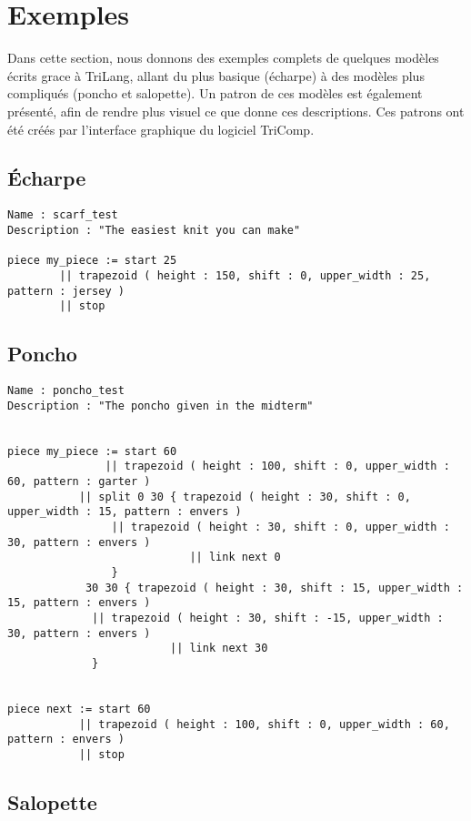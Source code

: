 \documentclass[a4paper,10pt]{article}
\begin{document}
\section{Exemples}

Dans cette section, nous donnons des exemples complets de quelques modèles écrits grace à TriLang, allant du plus basique (écharpe) à des modèles plus compliqués (poncho et salopette). Un patron de ces modèles est également présenté, afin de rendre plus visuel ce que donne ces descriptions. Ces patrons ont été créés par l'interface graphique du logiciel TriComp.

\subsection{Écharpe}

\begin{lstlisting}
Name : scarf_test
Description : "The easiest knit you can make"

piece my_piece := start 25
		|| trapezoid ( height : 150, shift : 0, upper_width : 25, pattern : jersey )
		|| stop
\end{lstlisting}


\subsection{Poncho}

\begin{lstlisting}
Name : poncho_test
Description : "The poncho given in the midterm"


piece my_piece := start 60
      	       || trapezoid ( height : 100, shift : 0, upper_width : 60, pattern : garter )
	       || split 0 30 { trapezoid ( height : 30, shift : 0, upper_width : 15, pattern : envers )
			    || trapezoid ( height : 30, shift : 0, upper_width : 30, pattern : envers )
                            || link next 0
			    }
			30 30 { trapezoid ( height : 30, shift : 15, upper_width : 15, pattern : envers )
			 || trapezoid ( height : 30, shift : -15, upper_width : 30, pattern : envers )
                         || link next 30
			 }


piece next := start 60
           || trapezoid ( height : 100, shift : 0, upper_width : 60, pattern : envers )
           || stop
\end{lstlisting}

\subsection{Salopette}
\end{document}
